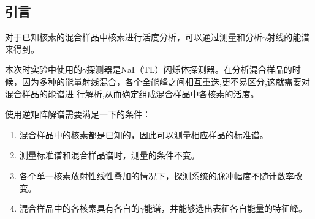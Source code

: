 \documentclass[a4paper,10.0pt,twoside]{npr}
\begin{document}
\begin{multicols}{2}

\section{引言}    %
\vspace*{-1mm}
\song\wuhao
对于已知核素的混合样品中核素进行活度分析，可以通过测量和分析$\gamma$射线的能谱来得到。

本次时实验中使用的$\gamma$探测器是NaI（TL）闪烁体探测器。在分析混合样品的时候，因为多种的能量射线混合，各个全能峰之间相互重迭,更不易区分,这就需要对混合样品的能谱进
行解析,从而确定组成混合样品中各核素的活度。

使用逆矩阵解谱需要满足一下的条件：

\begin{enumerate}
\item 混合样品中的核素都是已知的，因此可以测量相应样品的标准谱。
\item 测量标准谱和混合样品谱时，测量的条件不变。
\item 各个单一核素放射性线性叠加的情况下，探测系统的脉冲幅度不随计数率改变。
\item 混合样品中的各核素具有各自的$\gamma$能谱，并能够选出表征各自能量的特征峰。
\end{enumerate}


\end{multicols}
\end{document}
